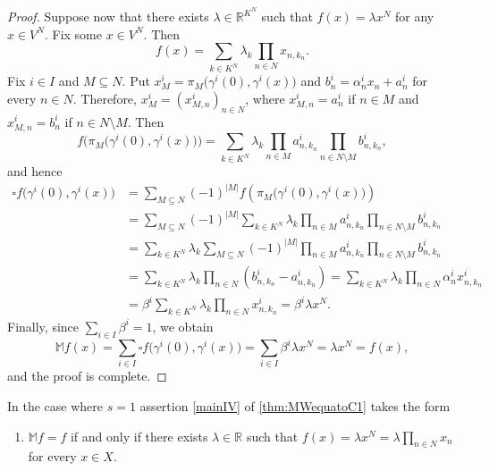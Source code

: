 \documentclass{amsart}
\theoremstyle{plain}%
\theoremstyle{definition}
\theoremstyle{remark}
\begin{document}
\begin{proof}
Suppose now that there exists $\lambda\in\mathbb R^{K^N}$ such that $f(x)=\lambda x^N$ for any $x\in V^N$. Fix some $x\in V^N$. Then
\begin{equation*}
f(x)=\sum_{k\in K^N}\lambda_k\prod_{n\in N}x_{n,k_n}.
\end{equation*}  
Fix $i\in I$ and $M\subseteq N$. Put $x^i_M=\pi_{M}\big(\gamma^i(0),\gamma^i(x)\big)$ and $b^i_n=\alpha^i_nx_n+a^i_n$ for every $n\in N$. Therefore, $x^i_M=(x^i_{M,n})_{n\in N}$, where $x^i_{M,n}=a^i_n$ if $n\in M$ and $x^i_{M,n}=b^i_n$ if $n\in N\setminus M$. Then
\begin{equation*}
f\Big(\pi_M\big(\gamma^i(0),\gamma^i(x)\big)\Big)
=\sum_{k\in K^N}\lambda_k\prod_{n\in M}a^i_{n,k_n}\prod_{n\in N\setminus M}b^i_{n,k_n}, 
\end{equation*}
and hence
\begin{align*}
\square f\big(\gamma^i(0),\gamma^i(x)\big)&=\sum_{M\subseteq N}(-1)^{|M|}
f\left(\pi_M\big(\gamma^i(0),\gamma^i(x)\big)\right)\\
&=\sum_{M\subseteq N}(-1)^{|M|}
\sum_{k\in K^N}\lambda_k\prod_{n\in M}a^i_{n,k_n}\prod_{n\in N\setminus M}b^i_{n,k_n} \\
&=\sum_{k\in K^N}\lambda_k\sum_{M\subseteq N}(-1)^{|M|}
\prod_{n\in M}a^i_{n,k_n}\prod_{n\in N\setminus M}b^i_{n,k_n} \\
&=\sum_{k\in K^N}\lambda_k\prod_{n\in N}(b^i_{n,k_n}-a^i_{n,k_n})
=\sum_{k\in K^N}\lambda_k\prod_{n\in N}\alpha^i_{n}x^i_{n,k_n}\\
&=\beta^i\sum_{k\in K^N}\lambda_k\prod_{n\in N}x^i_{n,k_n}
=\beta^i\lambda x^N.
\end{align*}
Finally, since $\sum\limits_{i\in I}\beta^i=1$, we obtain
\begin{equation*}
\mathbb{M}f(x)=\sum_{i\in I}\square f\big(\gamma^i(0),\gamma^i(x)\big)
=\sum_{i\in I}\beta^i\lambda x^N=\lambda x^N=f(x),
\end{equation*}
and the proof is complete.
\end{proof}

In the case where $s=1$ assertion \ref{mainIV} of \cref{thm:MWequatoC1} takes the form
\begin{enumerate}
\item[(\textit{iv'})] $\mathbb{M}f=f$ if and only if there exists $\lambda\in\mathbb{R}$ such that  $f(x)=\lambda x^N=\lambda\prod\limits_{n\in N}x_n$ for every $x\in X$.
\end{enumerate}

\end{document}
